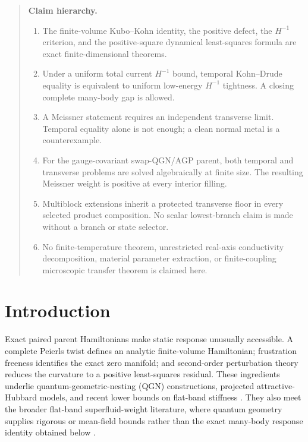 \documentclass[11pt]{article}
\theoremstyle{definition}
\theoremstyle{remark}
\begin{document}
\begin{quote}\small
\textbf{Claim hierarchy.}
\begin{enumerate}[leftmargin=1.6em,itemsep=0.12em,topsep=0.2em]
\item The finite-volume Kubo--Kohn identity, the positive defect, the $H^{-1}$ criterion, and the
positive-square dynamical least-squares formula are exact finite-dimensional theorems.
\item Under a uniform total current $H^{-1}$ bound, temporal Kohn--Drude equality is equivalent to
uniform low-energy $H^{-1}$ tightness.  A closing complete many-body gap is allowed.
\item A Meissner statement requires an independent transverse limit.  Temporal equality alone is not
enough; a clean normal metal is a counterexample.
\item For the gauge-covariant swap-QGN/AGP parent, both temporal and transverse problems are solved
algebraically at finite size.  The resulting Meissner weight is positive at every interior filling.
\item Multiblock extensions inherit a protected transverse floor in every selected product composition.
No scalar lowest-branch claim is made without a branch or state selector.
\item No finite-temperature theorem, unrestricted real-axis conductivity decomposition, material
parameter extraction, or finite-coupling microscopic transfer theorem is claimed here.
\end{enumerate}
\end{quote}

\section{Introduction}

Exact paired parent Hamiltonians make static response unusually accessible.  A complete Peierls twist
defines an analytic finite-volume Hamiltonian; frustration freeness identifies the exact zero manifold;
and second-order perturbation theory reduces the curvature to a positive least-squares residual.  These
ingredients underlie quantum-geometric-nesting (QGN) constructions, projected attractive-Hubbard
models, and recent lower bounds on flat-band stiffness \cite{Han2024,Gao2026}.  They also meet the
broader flat-band superfluid-weight literature, where quantum geometry supplies rigorous or mean-field
bounds rather than the exact many-body response identity obtained below
\cite{Peotta2015,Torma2022}.
\end{document}
